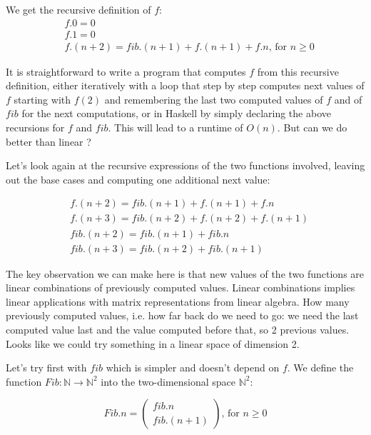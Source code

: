 We get the recursive definition of $f$:
\begin{equation*}
\begin{split}
& f.0 = 0 \\
& f.1 = 0 \\
& f.(n + 2) = \mathit{fib}.(n + 1) + f.(n + 1) + f.n \text{, for } n \geq 0
\end{split}   
\end{equation*}

It is straightforward to write a program that computes $f$ from this recursive definition, either iteratively with a loop that step by step computes next values of $f$ starting with $f(2)$ and remembering the last two computed values of $f$ and of $\mathit{fib}$ for the next computations, or in Haskell by simply declaring the above recursions for $f$ and $\mathit{fib}$. This will lead to a runtime of $O(n)$. But can we do better than linear ?

Let's look again at the recursive expressions of the two functions involved, leaving out the base cases and computing one additional next value:

\begin{equation*}
\begin{split}
& f.(n + 2) = \mathit{fib}.(n + 1) + f.(n + 1) + f.n \\
& f.(n + 3) = \mathit{fib}.(n + 2) + f.(n + 2) + f.(n + 1) \\
& \mathit{fib}.(n + 2) = \mathit{fib}.(n + 1) + \mathit{fib}.n \\
& \mathit{fib}.(n + 3) = \mathit{fib}.(n + 2) + \mathit{fib}.(n + 1)
\end{split}   
\end{equation*}

The key observation we can make here is that new values of the two functions are linear combinations of previously computed values. Linear combinations implies linear applications with matrix representations from linear algebra. How many previously computed values, i.e. how far back do we need to go: we need the last computed value last and the value computed before that, so 2 previous values. Looks like we could try something in a linear space of dimension 2. 

Let's try first with $\mathit{fib}$ which is simpler and doesn't depend on $f$. We define the function $\mathit{Fib}: \mathbb{N}  \rightarrow \mathbb{N}^2$ into the two-dimensional space $\mathbb{N}^2$:

\[
  \mathit{Fib}.n = 
  \begin{pmatrix}
       \mathit{fib}.n \\
       \mathit{fib}.(n + 1)
   \end{pmatrix}   \text{, for } n \geq 0 
\]

